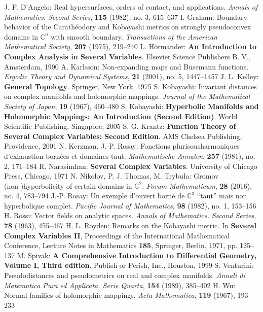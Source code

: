\begin{thebibliography}{widest entry}
   J. P. D'Angelo: Real hypersurfaces, orders of contact, and applications. \textit{Annals of Mathematics. Second Series}, \textbf{115} (1982), no. 3, 615--637
   I. Graham: Boundary behavior of the Carathéodory and Kobayashi metrics on strongly pseudoconvex domains in $\mathbb{C}^n$ with smooth boundary. \textit{Transactions of the American Mathematical Society}, \textbf{207} (1975), 219--240
   L. Hörmander: \textbf{An Introduction to Complex Analysis in Several Variables}. Elsevier Science Publishers B. V., Amsterdam, 1990
   A. Karlsson: Non-expanding maps and Busemann functions. \textit{Ergodic Theory and Dynamical Systems}, \textbf{21} (2001), no. 5, 1447--1457
   J. L. Kelley: \textbf{General Topology}. Springer, New York, 1975
   S. Kobayashi: Invariant distances on complex manifolds and holomorphic mappings. \textit{Journal of the Mathematical Society of Japan}, \textbf{19} (1967), 460--480
   S. Kobayashi: \textbf{Hyperbolic Manifolds and Holomorphic Mappings: An Introduction (Second Edition)}. World Scientific Publishing, Singapore, 2005
   S. G. Krantz: \textbf{Function Theory of Several Complex Variables: Second Edition}. AMS Chelsea Publishing, Providence, 2001
   N. Kerzman, J.-P. Rosay: Fonctions plurisousharmoniques d'exhaustion bornées et domaines taut. \textit{Mathematische Annalen}, \textbf{257} (1981), no. 2, 171--184
   R. Narasimhan: \textbf{Several Complex Variables}. University of Chicago Press, Chicago, 1971
   N. Nikolov, P. J. Thomas, M. Trybuła: Gromov (non-)hyperbolicity of certain domains in $\mathbb{C}^2$. \textit{Forum Mathematicum}, \textbf{28} (2016), no. 4, 783--794
   J.-P. Rosay: Un exemple d'ouvert borné de $\mathbb{C}^3$ ``taut'' mais non hyperbolique complet. \textit{Pacific Journal of Mathematics}, \textbf{98} (1982), no. 1, 153--156
   H. Rossi: Vector fields on analytic spaces. \textit{Annals of Mathematics. Second Series}, \textbf{78} (1963), 455--467
   H. L. Royden: Remarks on the Kobayashi metric. In \textbf{Several Complex Variables II}, Proceedings of the International Mathematical Conference, Lecture Notes in Mathematics \textbf{185}, Springer, Berlin, 1971, pp. 125--137
   M. Spivak: \textbf{A Comprehensive Introduction to Differential Geometry, Volume I, Third edition}. Publish or Perish, Inc., Houston, 1999
   S. Venturini: Pseudodistances and pseudometrics on real and complex manifolds. \textit{Annali di Matematica Pura ed Applicata. Serie Quarta}, \textbf{154} (1989), 385--402
   H. Wu: Normal families of holomorphic mappings. \textit{Acta Mathematica}, \textbf{119} (1967), 193--233
\end{thebibliography}
